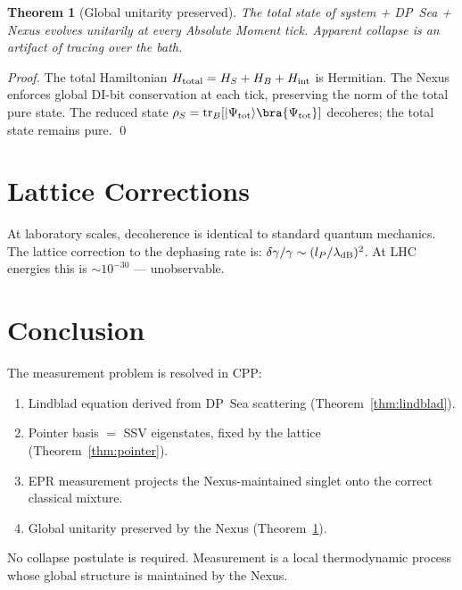 \documentclass[11pt,a4paper]{article}
\newtheorem{theorem}{Theorem}[section]
\newcommand{\lP}{l_P}
\newcommand{\ket}[1]{|#1\rangle}
\begin{document}
\begin{theorem}[Global unitarity preserved]
\label{thm:unitary}
The total state of system + DP~Sea + Nexus evolves unitarily at every
Absolute Moment tick.  Apparent collapse is an artifact of tracing
over the bath.
\end{theorem}

\begin{proof}
The total Hamiltonian $H_{\rm total} = H_S + H_B + H_{\rm int}$
is Hermitian.  The Nexus enforces global DI-bit conservation at each
tick, preserving the norm of the total pure state.  The reduced state
$\rho_S = \mathrm{tr}_B[\ket{\Psi_{\rm tot}}\bra{\Psi_{\rm tot}}]$
decoheres; the total state remains pure. \qed
\end{proof}

\section{Lattice Corrections}

At laboratory scales, decoherence is identical to standard quantum
mechanics.  The lattice correction to the dephasing rate is:
$\delta\gamma/\gamma \sim (\lP/\lambda_{\rm dB})^2$.  At LHC energies
this is $\sim 10^{-30}$ --- unobservable.

\section{Conclusion}

The measurement problem is resolved in CPP:
\begin{enumerate}
\item Lindblad equation derived from DP~Sea scattering
  (Theorem~\ref{thm:lindblad}).
\item Pointer basis $=$ SSV eigenstates, fixed by the lattice
  (Theorem~\ref{thm:pointer}).
\item EPR measurement projects the Nexus-maintained singlet onto the
  correct classical mixture.
\item Global unitarity preserved by the Nexus
  (Theorem~\ref{thm:unitary}).
\end{enumerate}
No collapse postulate is required.  Measurement is a local thermodynamic
process whose global structure is maintained by the Nexus.
\end{document}
